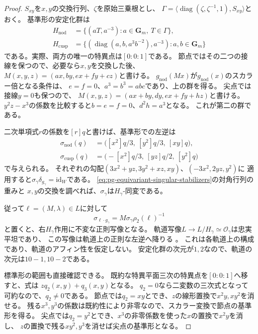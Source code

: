 \begin{proof}
$S_{xy}$を$x,y$の交換行列、$\zeta$を原始三乗根とし、
$\Gamma=\langle\operatorname{diag}(\zeta,\zeta^{-1},1),S_{xy}\rangle$とおく。
基準形の安定化群は
\begin{equation}
 \begin{aligned}
 H_{\mathrm{nod}}&=\{(aT,a^{-3}):a\in\mathbf G_m,\ T\in\Gamma\},\\
 H_{\mathrm{cusp}}&=\{(\operatorname{diag}(a,b,a^3b^{-2}),a^{-3}):
                      a,b\in\mathbf G_m\}
 \end{aligned}
 \label{eq:pg-equivariant-singular-stabilizers}
\end{equation}
である。実際、両方の唯一の特異点は$[0:0:1]$である。
節点ではその二つの接線を保つので、必要なら$x,y$を交換した後、
$M(x,y,z)=(ax,by,ex+fy+cz)$と書ける。
$g_{\mathrm{nod}}(Mx)$が$g_{\mathrm{nod}}(x)$のスカラー倍となる条件は、
$e=f=0$、$a^3=b^3=abc$であり、上の群を得る。
尖点では接線$y=0$も保つので、
$M(x,y,z)=(ax+by,dy,ex+fy+hz)$と書ける。
$y^2z-x^3$の係数を比較すると$b=e=f=0$、$d^2h=a^3$となる。
これが第二の群である。

二次単項式$r$の係数を$[r]q$と書けば、基準形での左逆は
\begin{equation}
 \begin{aligned}
 \sigma_{\mathrm{nod}}(q)
   &=\bigl([x^2]q/3,\ [y^2]q/3,\ [xy]q\bigr),\\
 \sigma_{\mathrm{cusp}}(q)
   &=\bigl(-[x^2]q/3,\ [yz]q/2,\ [y^2]q\bigr)
 \end{aligned}
 \label{eq:pg-equivariant-singular-retractions}
\end{equation}
で与えられる。
それぞれの勾配$(3x^2+yz,3y^2+xz,xy)$、$(-3x^2,2yz,y^2)$に
適用すると$\sigma_\gamma\delta_{g_\gamma}=\mathrm{id}_W$である。
\eqref{eq:pg-equivariant-singular-stabilizers}の対角行列の重みと
$x,y$の交換を調べれば、$\sigma_\gamma$は$H_\gamma$-同変である。

従って$\ell=(M,\lambda)\in L$に対して
\begin{equation}
 \sigma_{\ell\cdot g_\gamma}
   =M\sigma_\gamma\rho_2(\ell)^{-1}
 \label{eq:pg-equivariant-singular-transport}
\end{equation}
と置くと、右$H_\gamma$作用に不変な正則写像となる。
軌道写像$L\to L/H_\gamma\simeq\mathcal O_\gamma$は忠実平坦であり、
この写像は軌道上の正則な左逆へ降りる
\cite[Propositions~7.12, 7.17, pp.~142--143]{PMilneGroups}。
これは各軌道上の構成であり、軌道のアフィン性を仮定しない。
安定化群の次元が$1,2$なので、軌道の次元は$10-1,10-2$である。

標準形の範囲も直接確認できる。
既約な特異平面三次の特異点を$[0:0:1]$へ移すと、式は
$zq_2(x,y)+q_3(x,y)$となる。
$q_2=0$なら二変数の三次式となって可約なので、$q_2\ne0$である。
節点では$q_2=xy$とでき、$z$の線形置換で$x^2y,xy^2$を消せる。
残る$x^3,y^3$の係数は既約性により非零なので、スカラー変換で節点の基準形を得る。
尖点では$q_2=y^2$とでき、$x^3$の非零係数を使った$x$の置換で$x^2y$を消し、
$z$の置換で残る$xy^2,y^3$を消せば尖点の基準形となる。
\end{proof}

